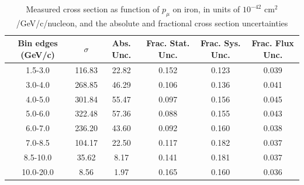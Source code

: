 \documentclass[../main.tex]{subfiles}
\begin{document}
\begin{table}
  \centering
  \renewcommand{\arraystretch}{1.15}
  \caption{Measured cross section as function of $p_{\mu}$ on iron, in units of $10^{-42}$ $\text{cm}^2$/GeV/c/nucleon, and the absolute and fractional cross section uncertainties}
    \begin{tabular}{c||c|c||c|c|c}
      Bin edges (GeV/c) &  $\sigma$  &  Abs. Unc.  &  Frac. Stat. Unc.  &  Frac. Sys. Unc.  &  Frac. Flux Unc. \\
      \hline
      \hline
      1.5-3.0 & 116.83 & 22.82 & 0.152 & 0.123 & 0.039\\
      3.0-4.0 & 268.85 & 46.29 & 0.106 & 0.136 & 0.041\\
      4.0-5.0 & 301.84 & 55.47 & 0.097 & 0.156 & 0.045\\
      5.0-6.0 & 322.48 & 57.36 & 0.088 & 0.155 & 0.043\\
      6.0-7.0 & 236.20 & 43.60 & 0.092 & 0.160 & 0.038\\
      7.0-8.5 & 104.17 & 22.50 & 0.117 & 0.182 & 0.037\\
      8.5-10.0 & 35.62 & 8.17 & 0.141 & 0.181 & 0.037\\
      10.0-20.0 & 8.56 & 1.97 & 0.165 & 0.160 & 0.036
    \end{tabular}
  \label{tbl:datanucleonnuc26muon_pa}
\end{table}
\begin{table}
  \centering
  \renewcommand{\arraystretch}{1.15}
  \caption{Statistical covariance matrix of measured cross section as function of $p_{\mu}$ on iron, in units of $10^{-84}$ $(\text{cm}^2$/GeV/c/nucleon$)^2$}
  \label{tbl:statnucleonnuc26muon_pb}
\end{table}
\end{document}
